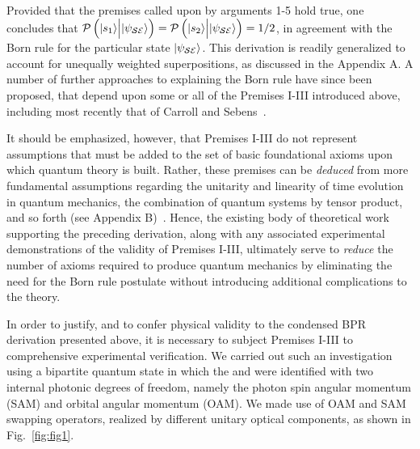 \documentclass[12pt]{iopart}
\begin{document}
Provided that the premises called upon by arguments 1-5 hold true, one concludes that ${\cal P}\left(|s_1\rangle {\Big |} |\psi_{\cal SE} \rangle \right)={\cal P}\left(|s_2\rangle {\Big |} |\psi_{\cal SE} \rangle \right)=1/2$, in agreement with the Born rule for the particular state $ |\psi_{\cal SE} \rangle$. This derivation is readily generalized to account for unequally weighted superpositions, as discussed in the Appendix A.  A number of further approaches to explaining the Born rule have since been proposed, that depend upon some or all of the Premises I-III introduced above, including most recently that of Carroll and Sebens~\cite{carroll:14}.

It should be emphasized, however, that Premises I-III do not represent assumptions that must be added to the set of basic foundational axioms upon which quantum theory is built. Rather, these premises can be {\it deduced} from more fundamental assumptions regarding the unitarity and linearity of time evolution in quantum mechanics, the combination of quantum systems by tensor product, and so forth (see Appendix B)~\cite{zurek:05}. Hence, the existing body of theoretical work supporting the preceding derivation, along with any associated experimental demonstrations of the validity of Premises I-III, ultimately serve to \textit{reduce} the number of axioms required to produce quantum mechanics by eliminating the need for the Born rule postulate without introducing additional complications to the theory. 

In order to justify, and to confer physical validity to the condensed BPR derivation presented above, it is necessary to subject Premises I-III to comprehensive experimental verification. We carried out such an investigation using a bipartite quantum state in which the  and  were identified with two internal photonic degrees of freedom, namely the photon spin angular momentum (SAM) and orbital angular momentum (OAM). We made use of OAM and SAM swapping operators, realized by different unitary optical components, as shown in Fig.~\ref{fig:fig1}.
\end{document}
